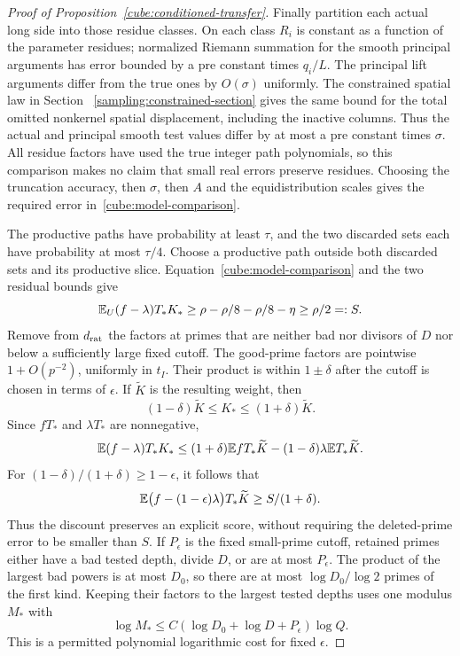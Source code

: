 \begin{proof}[Proof of Proposition~\ref{cube:conditioned-transfer}]
Finally partition each actual long side into those residue classes.
On each class $R_i$ is constant as a function of the parameter
residues; normalized Riemann summation for the smooth principal
arguments has error bounded by a pre constant times $q_i/L$.
The principal lift arguments differ from the true ones by
$O(\sigma)$ uniformly.  The constrained spatial law in Section~
\ref{sampling:constrained-section} gives the same bound for the total omitted
nonkernel spatial displacement, including the inactive columns.
Thus the actual and principal smooth test values differ by at most
a pre constant times $\sigma$.  All residue factors have used the
true integer path polynomials, so this comparison makes no claim
that small real errors preserve residues.  Choosing the truncation
accuracy, then $\sigma$, then $A$ and the equidistribution scales
gives the required error in~\eqref{cube:model-comparison}.

The productive paths have probability at least $\tau$, and the
two discarded sets each have probability at most $\tau/4$.
Choose a productive path outside both discarded sets and its
productive slice.
Equation~\eqref{cube:model-comparison} and the two residual bounds
give
\[
 \mathbb E_U(f-\lambda)T_*K_*
 \ge\rho-\rho/8-\rho/8-\eta\ge\rho/2=:S.
\]
Remove from $d_{\rm rat}$ the factors at primes that are neither
bad nor divisors of $D$ nor below a sufficiently large fixed cutoff.
The good-prime factors are pointwise $1+O(p^{-2})$, uniformly in
$t_I$.  Their product is within $1\pm\delta$ after the cutoff is
chosen in terms of $\epsilon$.  If $\widetilde K$ is the resulting
weight, then
\[
 (1-\delta)\widetilde K\le K_*\le(1+\delta)\widetilde K.
\]
Since $fT_*$ and $\lambda T_*$ are nonnegative,
\[
 \mathbb E(f-\lambda)T_*K_*
 \le(1+\delta)\mathbb E fT_*\widetilde K
       -(1-\delta)\lambda\mathbb E T_*\widetilde K.
\]
For $(1-\delta)/(1+\delta)\ge1-\epsilon$, it follows that
\[
 \mathbb E\bigl(f-(1-\epsilon)\lambda\bigr)T_*\widetilde K
 \ge S/(1+\delta).
\]
Thus the discount preserves an explicit score, without requiring
the deleted-prime error to be smaller than $S$.  If $P_\epsilon$
is the fixed small-prime cutoff, retained primes either have a bad
tested depth, divide $D$, or are at most $P_\epsilon$.  The product
of the largest bad powers is at most $D_0$, so there are at most
$\log D_0/\log2$ primes of the first kind.  Keeping their factors
to the largest tested depths uses one modulus $M_*$ with
\[
 \log M_*\le
 C(\log D_0+\log D+P_\epsilon)\log Q.
\]
This is a permitted polynomial logarithmic cost for fixed
$\epsilon$.


\end{proof}
